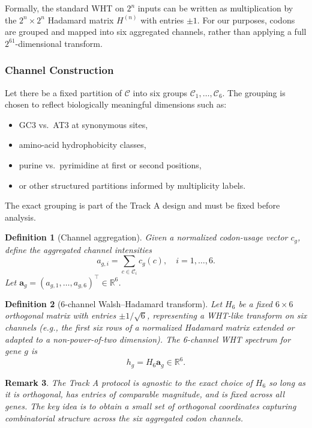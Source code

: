 \documentclass[11pt]{article}
\newtheorem{definition}{Definition}[section]
\newtheorem{remark}[definition]{Remark}
\newcommand{\R}{\mathbb{R}}
\newcommand{\vect}[1]{\bm{#1}}
\begin{document}
Formally, the standard WHT on \(2^n\) inputs can be written as multiplication by the \(2^n \times 2^n\) Hadamard matrix \(H^{(n)}\) with entries \(\pm 1\).
For our purposes, codons are grouped and mapped into six aggregated channels, rather than applying a full \(2^{61}\)-dimensional transform.

\subsubsection{Channel Construction}

Let there be a fixed partition of \(\mathcal{C}\) into six groups \(\mathcal{C}_1, \dots, \mathcal{C}_6\).
The grouping is chosen to reflect biologically meaningful dimensions such as:
\begin{itemize}[leftmargin=1.8em]
  \item GC3 vs.\ AT3 at synonymous sites,
  \item amino-acid hydrophobicity classes,
  \item purine vs.\ pyrimidine at first or second positions,
  \item or other structured partitions informed by multiplicity labels.
\end{itemize}
The exact grouping is part of the Track A design and must be fixed before analysis.

\begin{definition}[Channel aggregation]
Given a normalized codon-usage vector \(c_g\), define the aggregated channel intensities
\[
  a_{g,i} = \sum_{c \in \mathcal{C}_i} c_g(c), \quad i=1,\dots,6.
\]
Let \(\vect{a}_g = (a_{g,1}, \dots, a_{g,6})^\top \in \R^6\).
\end{definition}

\begin{definition}[6-channel Walsh--Hadamard transform]
Let \(H_6\) be a fixed \(6 \times 6\) orthogonal matrix with entries \(\pm 1 / \sqrt{6}\), representing a WHT-like transform on six channels (e.g., the first six rows of a normalized Hadamard matrix extended or adapted to a non-power-of-two dimension).
The 6-channel WHT spectrum for gene \(g\) is
\[
  h_g = H_6 \vect{a}_g \in \R^6.
\]
\end{definition}

\begin{remark}
The Track A protocol is agnostic to the exact choice of \(H_6\) so long as it is orthogonal, has entries of comparable magnitude, and is fixed across all genes.
The key idea is to obtain a small set of orthogonal coordinates capturing combinatorial structure across the six aggregated codon channels.
\end{remark}
\end{document}
